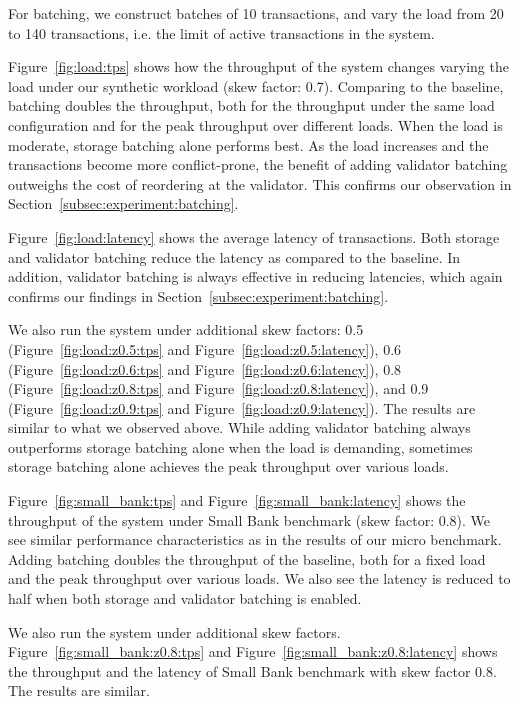 For batching, we construct batches of 10 transactions, and vary the load from 20 to 140 transactions, i.e. the limit of active transactions in the system.

Figure~\ref{fig:load:tps} shows how the throughput of the system changes varying the load under our synthetic workload (skew factor: 0.7). Comparing to the baseline, batching doubles the throughput, both for the throughput under the same load configuration and for the peak throughput over different loads. 
When the load is moderate, storage batching alone performs best. As the load increases and the transactions become more conflict-prone, the benefit of adding validator batching outweighs the cost of reordering at the validator. This confirms our observation in Section~\ref{subsec:experiment:batching}. 

Figure~\ref{fig:load:latency} shows the average latency of transactions. Both storage and validator batching reduce the latency as compared to the baseline. In addition, validator batching is always effective in reducing latencies, which again confirms our findings in Section~\ref{subsec:experiment:batching}.

We also run the system under additional skew factors: 0.5 (Figure~\ref{fig:load:z0.5:tps} and Figure~\ref{fig:load:z0.5:latency}), 0.6 (Figure~\ref{fig:load:z0.6:tps} and Figure~\ref{fig:load:z0.6:latency}), 0.8 (Figure~\ref{fig:load:z0.8:tps} and Figure~\ref{fig:load:z0.8:latency}), and 0.9 (Figure~\ref{fig:load:z0.9:tps} and Figure~\ref{fig:load:z0.9:latency}). The results are similar to what we observed above. While adding validator batching always outperforms storage batching alone when the load is demanding, sometimes storage batching alone achieves the peak throughput over various loads. 


Figure~\ref{fig:small_bank:tps} and Figure~\ref{fig:small_bank:latency} shows the throughput of the system under Small Bank benchmark (skew factor: 0.8). We see similar performance characteristics as in the results of our micro benchmark. Adding batching doubles the throughput of the baseline, both for a fixed load and the peak throughput over various loads. We also see the latency is reduced to half when both storage and validator batching is enabled.

We also run the system under additional skew factors. Figure~\ref{fig:small_bank:z0.8:tps} and Figure~\ref{fig:small_bank:z0.8:latency} shows the throughput and the latency of Small Bank benchmark with skew factor 0.8. The results are similar.